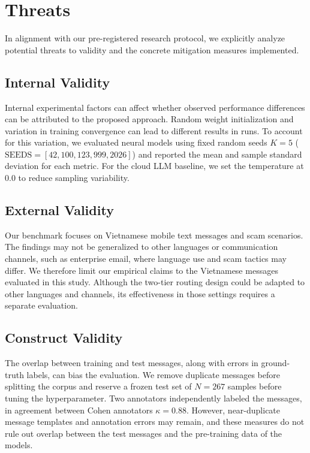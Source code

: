 \section{Threats}
\label{sec:threats}

In alignment with our pre-registered research protocol, we explicitly analyze potential threats to validity and the concrete mitigation measures implemented.

\subsection{Internal Validity}
Internal experimental factors can affect whether observed performance differences can be attributed to the proposed approach. Random weight initialization and variation in training convergence can lead to different results in runs. To account for this variation, we evaluated neural models using fixed random seeds $K = 5$ ($\text{SEEDS} = [42, 100, 123, 999, 2026]$) and reported the mean and sample standard deviation for each metric. For the cloud LLM baseline, we set the temperature at 0.0 to reduce sampling variability.

\subsection{External Validity}
Our benchmark focuses on Vietnamese mobile text messages and scam scenarios. The findings may not be generalized to other languages or communication channels, such as enterprise email, where language use and scam tactics may differ. We therefore limit our empirical claims to the Vietnamese messages evaluated in this study. Although the two-tier routing design could be adapted to other languages and channels, its effectiveness in those settings requires a separate evaluation.

\subsection{Construct Validity}
The overlap between training and test messages, along with errors in ground-truth labels, can bias the evaluation. We remove duplicate messages before splitting the corpus and reserve a frozen test set of $N = 267$ samples before tuning the hyperparameter. Two annotators independently labeled the messages, in agreement between Cohen annotators $\kappa = 0.88$. However, near-duplicate message templates and annotation errors may remain, and these measures do not rule out overlap between the test messages and the pre-training data of the models. 

